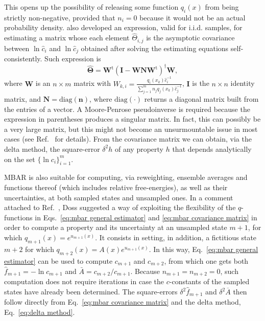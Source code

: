 \documentclass[journal=jctcce,manuscript=article,layout=twocolumn]{achemso}
\newcommand{\mt}[1]{\boldsymbol{\mathbf{#1}}}   %
\newcommand{\vt}[1]{\boldsymbol{\mathbf{#1}}}   %
\newcommand{\tr}[1]{#1^\text{t}}                %
\begin{document}
This opens up the possibility of releasing some function $q_i(x)$ from being strictly non-negative, provided that $n_i = 0$ because it would not be an actual probability density. \citeauthor{Kong_2003} \cite{Kong_2003} also developed an expression, valid for i.i.d. samples, for estimating a matrix whose each element $\hat \Theta_{i,j}$ is the asymptotic covariance between $\ln \hat c_i$ and $\ln \hat c_j$ obtained after solving the estimating equations self-consistently. Such expression is
\begin{equation}
\label{eq:mbar covariance matrix}
\hat{\mt \Theta} = \tr{\mt W} (\mt I - {\mt W}{\mt N}\tr{\mt W})^\dag {\mt W},
\end{equation}
where $\mt W$ is an $n \times m$ matrix with $W_{k,i} = \frac{q_i(x_k) \hat c_i^{-1}}{\sum_{j=1}^m n_j q_j(x_k) \hat c_j^{-1}}$, $\mt I$ is the $n \times n$ identity matrix, and $\mt N = \text{diag}(\vt n)$, where $\text{diag}(\cdot)$ returns a diagonal matrix built from the entries of a vector. A Moore-Penrose pseudoinverse is required because the expression in parentheses produces a singular matrix. In fact, this can possibly be a very large matrix, but this might not become an unsurmountable issue in most cases (see Ref.~ for details). From the covariance matrix we can obtain, via the delta method, the square-error $\delta^2 h$ of any property $h$ that depends analytically on the set $\{\ln c_i\}_{i=1}^m$.

MBAR is also suitable for computing, via reweighting, ensemble averages and functions thereof (which includes relative free-energies), as well as their uncertainties, at both sampled states and unsampled ones. In a comment attached to Ref.~, Doss suggested a way of exploiting the flexibility of the $q$-functions in Eqs.~\eqref{eq:mbar general estimator} and \eqref{eq:mbar covariance matrix} in order to compute a property and its uncertainty at an unsampled state $m+1$, for which $q_{m+1}(x) = e^{u_{m+1}(x)}$. It consists in setting, in addition, a fictitious state $m+2$ for which $q_{m+2}(x) = A(x)e^{u_{m+1}(x)}$. In this way, Eq.~\eqref{eq:mbar general estimator} can be used to compute $c_{m+1}$ and $c_{m+2}$, from which one gets both $\hat f_{m+1} = -\ln c_{m+1}$ and $\bar A = {c_{m+2}}/{c_{m+1}}$. Because $n_{m+1} = n_{m+2} = 0$, such computation does not require iterations in case the $c$-constants of the sampled states have already been determined. The square-errors $\delta^2 \hat f_{m+1}$ and $\delta^2 \overline A$ then follow directly from Eq.~\eqref{eq:mbar covariance matrix} and the delta method, Eq.~\eqref{eq:delta method}.
\end{document}
